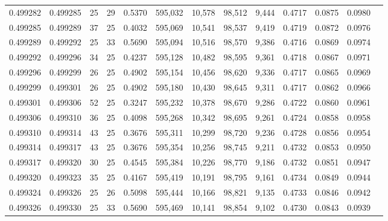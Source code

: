 \begin{tabular}{rrrrrrrrrrrrr}
0.499282 & 0.499285 &    25 &  29 &                                     0.5370 & 595,032 &  10,578 &  98,512 &   9,444 & 0.4717 & 0.0875 & 0.0980 \\
0.499285 & 0.499289 &    37 &  25 &                                     0.4032 & 595,069 &  10,541 &  98,537 &   9,419 & 0.4719 & 0.0872 & 0.0976 \\
0.499289 & 0.499292 &    25 &  33 &                                     0.5690 & 595,094 &  10,516 &  98,570 &   9,386 & 0.4716 & 0.0869 & 0.0974 \\
0.499292 & 0.499296 &    34 &  25 &                                     0.4237 & 595,128 &  10,482 &  98,595 &   9,361 & 0.4718 & 0.0867 & 0.0971 \\
0.499296 & 0.499299 &    26 &  25 &                                     0.4902 & 595,154 &  10,456 &  98,620 &   9,336 & 0.4717 & 0.0865 & 0.0969 \\
0.499299 & 0.499301 &    26 &  25 &                                     0.4902 & 595,180 &  10,430 &  98,645 &   9,311 & 0.4717 & 0.0862 & 0.0966 \\
0.499301 & 0.499306 &    52 &  25 &                                     0.3247 & 595,232 &  10,378 &  98,670 &   9,286 & 0.4722 & 0.0860 & 0.0961 \\
0.499306 & 0.499310 &    36 &  25 &                                     0.4098 & 595,268 &  10,342 &  98,695 &   9,261 & 0.4724 & 0.0858 & 0.0958 \\
0.499310 & 0.499314 &    43 &  25 &                                     0.3676 & 595,311 &  10,299 &  98,720 &   9,236 & 0.4728 & 0.0856 & 0.0954 \\
0.499314 & 0.499317 &    43 &  25 &                                     0.3676 & 595,354 &  10,256 &  98,745 &   9,211 & 0.4732 & 0.0853 & 0.0950 \\
0.499317 & 0.499320 &    30 &  25 &                                     0.4545 & 595,384 &  10,226 &  98,770 &   9,186 & 0.4732 & 0.0851 & 0.0947 \\
0.499320 & 0.499323 &    35 &  25 &                                     0.4167 & 595,419 &  10,191 &  98,795 &   9,161 & 0.4734 & 0.0849 & 0.0944 \\
0.499324 & 0.499326 &    25 &  26 &                                     0.5098 & 595,444 &  10,166 &  98,821 &   9,135 & 0.4733 & 0.0846 & 0.0942 \\
0.499326 & 0.499330 &    25 &  33 &                                     0.5690 & 595,469 &  10,141 &  98,854 &   9,102 & 0.4730 & 0.0843 & 0.0939 \\

\end{tabular}
